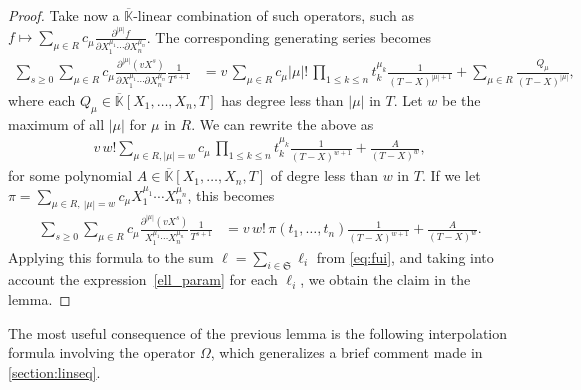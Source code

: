\documentclass[12pt]{article}
\newcommand{\lf}{X}
\def\Kbar {{\ensuremath{\overline{\mathbb{K}}}}}
\begin{document}
\begin{proof}
  Take now a $\Kbar$-linear combination of such operators, such as $f \mapsto
  \sum_{\mu \in R} c_\mu \frac{ \partial^{|\mu|} f } {\partial
    X_1^{\mu_1} \cdots \partial X_n^{\mu_n}}$. The corresponding
  generating series becomes
  \begin{align*}
    \sum_{s \ge 0} \sum_{\mu \in R} c_\mu \frac{ \partial^{|\mu|} ( v
      \lf^s )} {\partial X_1^{\mu_1} \cdots \partial X_n^{\mu_n}}
    \frac{1}{T^{s+1}} &= v\,\sum_{\mu \in R} c_\mu |\mu|!\, \prod_{1
      \le k \le n} t_k^{\mu_k} \frac {1}{(T-\lf )^{|\mu|+1}} +\sum_{\mu
      \in R} \frac{Q_\mu}{(T-\lf)^{|\mu|}},
  \end{align*}
  where each $Q_\mu \in \Kbar[X_1,\dots,X_n,T]$ has degree less than
  $|\mu|$ in $T$.  Let $w$ be the maximum of all $|\mu|$ for $\mu$ in
  $R$. We can rewrite the above as
  \begin{align*}
    v\, w! 
    \sum_{\mu \in R, |\mu|=w} c_\mu
    \, \prod_{1 \le k \le n} 
    t_k^{\mu_k}
    \frac {1}{(T-\lf )^{w+1}}
	+ \frac{A}{(T-\lf )^{w}},
  \end{align*}
  for some polynomial $A \in \Kbar[X_1,\dots,X_n,T]$ of degre less than $w$ in $T$. If we let 
  $\pi =\sum_{\mu \in R,\ |\mu|=w} c_{\mu} X_1^{\mu_1} \cdots
  X_n^{\mu_n}$, this becomes
  \begin{align*}
    \sum_{s \ge 0} 
    \sum_{\mu \in R} c_\mu \frac{ \partial^{|\mu|} ( v \lf^s )} { X_1^{\mu_1} \cdots
      X_n^{\mu_n}}
    \frac{1}{T^{s+1}} 
    &=
    v\, w! \,  \pi(t_1,\dots,t_n)
    \frac {1}{(T-\lf )^{w+1}}
    + \frac{A}{(T-\lf )^{w}}.
  \end{align*}
  Applying this formula to the sum $\ell=\sum_{i \in
    \mathfrak{S}}\ell_i$ from \cref{eq:fui}, and taking into account
  the expression~\ref{ell_param} for each $\ell_i$, we obtain the
  claim in the lemma.
\end{proof}

\noindent 
The most useful consequence of the previous lemma is the following
interpolation formula involving the operator $\Omega$, which
generalizes a brief comment made in \cref{section:linseq}.
\end{document}

